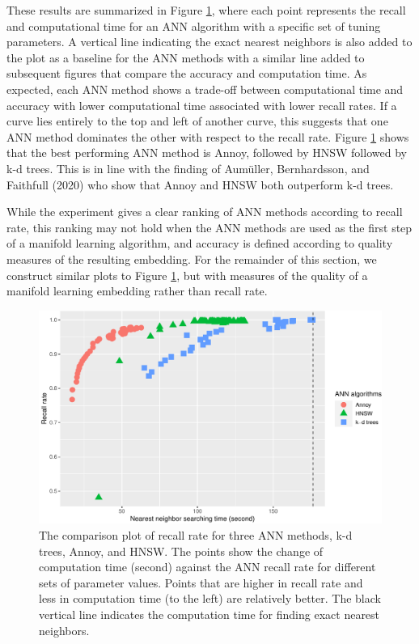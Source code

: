\documentclass[12pt]{article}
\begin{document}
These results are summarized in Figure \ref{fig:recall}, where each point represents the recall and computational time for an ANN algorithm with a specific set of tuning parameters.
A vertical line indicating the exact nearest neighbors is also added to the plot as a baseline for the ANN methods with a similar line added to subsequent figures that compare the accuracy and computation time. As expected, each ANN method shows a trade-off between computational time and accuracy with lower computational time associated with lower recall rates. If a curve lies entirely to the top and left of another curve, this suggests that one ANN method dominates the other with respect to the recall rate. Figure \ref{fig:recall} shows that the best performing ANN method is Annoy, followed by HNSW followed by k-d trees. This is in line with the finding of Aumüller, Bernhardsson, and Faithfull (2020) who show that Annoy and HNSW both outperform k-d trees.

While the experiment gives a clear ranking of ANN methods according to recall rate, this ranking may not hold when the ANN methods are used as the first step of a manifold learning algorithm, and accuracy is defined according to quality measures of the resulting embedding. For the remainder of this section, we construct similar plots to Figure \ref{fig:recall}, but with measures of the quality of a manifold learning embedding rather than recall rate.

\begin{figure}

{\centering \includegraphics[width=0.8\linewidth]{mlann_jcgs_files/figure-latex/recall-1} 

}

\caption{The comparison plot of recall rate for three ANN methods, k-d trees, Annoy, and HNSW. The points show the change of computation time (second) against the ANN recall rate for different sets of parameter values. Points that are higher in recall rate and less in computation time (to the left) are relatively better. The black vertical line indicates the computation time for finding exact nearest neighbors. }\label{fig:recall}
\end{figure}
\end{document}
